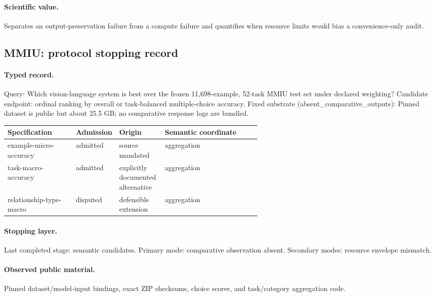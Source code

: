 \paragraph{Scientific value.} Separates an output-preservation failure from a compute failure and quantifies when resource limits would bias a convenience-only audit.

\subsection{MMIU: protocol stopping record}\label{app:r8-mmiu}

\paragraph{Typed record.} Query: Which vision-language system is best over the frozen 11,698-example, 52-task MMIU test set under declared weighting? Candidate endpoint: ordinal ranking by overall or task-balanced multiple-choice accuracy. Fixed substrate (absent\_comparative\_outputs): Pinned dataset is public but about 25.5 GB; no comparative response logs are bundled.

\begingroup
\scriptsize
\begin{tabularx}{\linewidth}{@{}p{0.27\linewidth}p{0.14\linewidth}p{0.18\linewidth}X@{}}
\toprule
Specification & Admission & Origin & Semantic coordinate \\
\midrule
example-micro-accuracy & admitted & source mandated & aggregation \\
task-macro-accuracy & admitted & explicitly documented alternative & aggregation \\
relationship-type-macro & disputed & defensible extension & aggregation \\
\bottomrule
\end{tabularx}
\endgroup

\paragraph{Stopping layer.} Last completed stage: semantic candidates. Primary mode: comparative observation absent. Secondary modes: resource envelope mismatch.

\paragraph{Observed public material.} Pinned dataset/model-input bindings, exact ZIP checksums, choice scorer, and task/category aggregation code.


